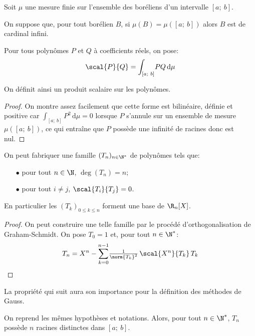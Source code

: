 \begin{de}
Soit $\mu$ une mesure finie sur l'ensemble des boréliens d'un intervalle $[a;~b]$. 

\medskip
On suppose que, pour tout borélien $B$, si $\mu(B) = \mu([a;~b])$ alors $B$ est de cardinal infini.

\medskip
Pour tous polynômes $P$ et $Q$ à coefficients réels, on pose:
\[
\scal{P}{Q} = \displaystyle{\int_{[a;~b]}} PQ \, \mathrm d \mu
\]

On définit ainsi un produit scalaire sur les polynômes.
\end{de}


\begin{proof}
On montre assez facilement que cette forme est bilinéaire, définie et positive car $\displaystyle{\int_{[a;~b]}} P^2 \, \mathrm d \mu = 0$ lorsque $P$ s'annule sur un ensemble de mesure $\mu\left ( [a;~b]\right )$, ce qui entraîne que $P$ possède une infinité de racines donc est nul.
\end{proof}


\begin{prop}
On peut fabriquer une famille $(T_n)_{n \in \N^*}$ de polynômes tels que:
\begin{itemize}
\item[$\bullet$] 
pour tout $n \in \N$, $\deg(T_n) = n$;
\item[$\bullet$] 
pour tout $i \neq j$, $\scal{T_i}{T_j} = 0$.
\end{itemize}

En particulier les $(T_k)_{0 \leq k \leq n}$ forment une base de $\R_n[X]$.
\end{prop}

\begin{proof}
On peut construire une telle famille par le procédé d'orthogonalisation de Graham-Schmidt. On pose $T_0 = 1$ et, pour tout $n \in \N^*$:
\[
T_n = X^n - \displaystyle{\sum_{k=0}^{n-1}} \tfrac{1}{\norm{T_k}^2} \, \scal{X^n}{T_k} \, T_k
\]
\end{proof}

La propriété qui suit aura son importance pour la définition des méthodes de Gauss.

\begin{prop}
On reprend les mêmes hypothèses et notations. Alors, pour tout $n \in \N^*$, $T_n$ possède $n$ racines distinctes dans $[a;~b]$.
\end{prop}



